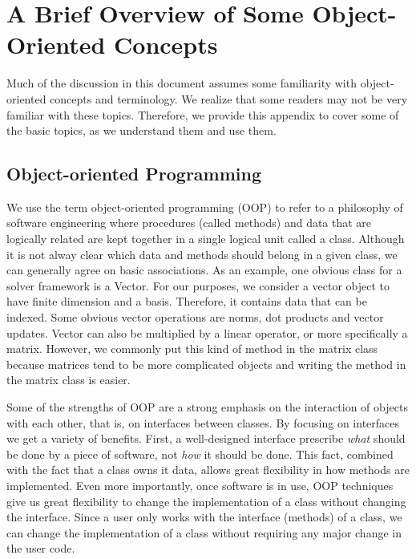 \documentclass[12pt,relax]{SANDreport}
\begin{document}
    \clearpage
    
    


    \appendix
\section{A Brief Overview of Some Object-Oriented Concepts}
\label{sect:OOTutorial}

Much of the discussion in this document assumes some familiarity with object-oriented
concepts and terminology. We realize that some readers may not be very familiar with these 
topics. Therefore, we provide this appendix to cover some of the basic topics, as we 
understand them and use them.

\subsection{Object-oriented Programming}
We use the term object-oriented programming (OOP) to refer to a philosophy of 
software engineering where 
procedures (called methods) and data that are logically related are kept together in a single
logical unit called a class.  
Although it is not alway clear which data and methods should belong in a given class, we
can generally agree on basic associations.  As an example, one obvious class for a solver
framework is a Vector.  For our purposes, we consider a vector object to have finite dimension
and a basis.  Therefore, it contains data that can be indexed.  Some obvious vector operations
are norms, dot products and vector updates.  Vector can also be multiplied by a linear operator,
or more specifically a matrix.  However, we commonly put this kind of method in the matrix
class because matrices tend to be more complicated objects and writing the method in the matrix
class is easier.

Some of the strengths of OOP are a strong emphasis on the interaction of objects with each
other, that is, on interfaces between classes.  By focusing on interfaces we get a variety of
benefits.  First, a well-designed interface prescribe {\it what} should be done by a piece of
software, not {\it how} it should be done.  This fact, combined with the fact that a class
owns it data, allows great flexibility in how methods are implemented.  Even more importantly,
once software is in use, OOP techniques give us great flexibility to change the implementation
of a class without changing the interface.  Since a user only works with the interface 
(methods) of a class, we can change the implementation of a class without requiring any major
change in the user code.  
\end{document}
